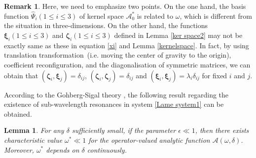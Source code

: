 \documentclass[10pt,reqno,oneside]{amsart}%
\newtheorem{lem}{Lemma}[section]
\theoremstyle{definition}
\newtheorem{rem}{Remark}[section]
\theoremstyle{remark}
\numberwithin{equation}{section}
\numberwithin{equation}{section}
\begin{document}
\begin{rem}
Here, we need to emphasize two points. On the one hand, the basis function $\hat{\Psi}_{i}(1\leq i\leq 3)$ of kernel space $\mathcal{A}^*_0$ is related to $\omega$, which is different from the situation in three-dimensions. On the other hand, the functions $\boldsymbol{\xi}_i(1\leq i\leq 3)$ and $\boldsymbol{\zeta}_i(1\leq i\leq 3)$ defined in Lemma \ref{ker space2} may not be exactly same as these in equation \eqref{xi} and Lemma \ref{kernelspace}. {In fact}, by using translation transformation~(i.e. moving the center of gravity to the origin), coefficient reconfiguration, and the diagonalisation of symmetric matrices, we can obtain that $(\boldsymbol{\zeta}_i,\boldsymbol{\xi}_j)=\delta_{ij}$, $(\boldsymbol{\zeta}_i,\boldsymbol{\zeta}_j)=\delta_{ij}$ and $(\boldsymbol{\xi}_i,\boldsymbol{\xi}_j)=\lambda_i\delta_{ij}$ for fixed $i$ and $j$.
\end{rem}

According to the Gohberg-Sigal theory \cite{SpectralAnalysis}, the following result regarding the existence of sub-wavelength resonances in system \eqref{Lame system1} can be obtained.
\begin{lem}
For any $\delta$ sufficiently small, if the parameter $\epsilon\ll 1$, then there exists characteristic value $\omega^* \ll 1$ for the operator-valued analytic function $\mathcal{A}(\omega,\delta)$. Moreover, $\omega^*$ depends on $\delta$ continuously.
\end{lem}
\end{document}
